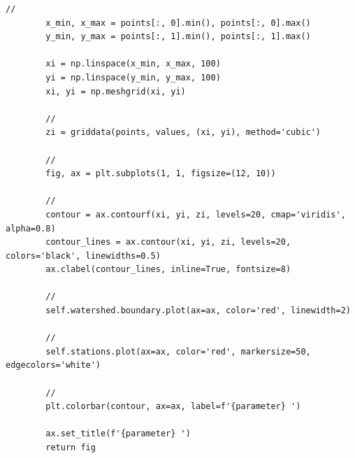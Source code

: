 \begin{lstlisting}[style=python]
        // 
        x_min, x_max = points[:, 0].min(), points[:, 0].max()
        y_min, y_max = points[:, 1].min(), points[:, 1].max()
        
        xi = np.linspace(x_min, x_max, 100)
        yi = np.linspace(y_min, y_max, 100)
        xi, yi = np.meshgrid(xi, yi)
        
        // 
        zi = griddata(points, values, (xi, yi), method='cubic')
        
        // 
        fig, ax = plt.subplots(1, 1, figsize=(12, 10))
        
        // 
        contour = ax.contourf(xi, yi, zi, levels=20, cmap='viridis', alpha=0.8)
        contour_lines = ax.contour(xi, yi, zi, levels=20, colors='black', linewidths=0.5)
        ax.clabel(contour_lines, inline=True, fontsize=8)
        
        // 
        self.watershed.boundary.plot(ax=ax, color='red', linewidth=2)
        
        // 
        self.stations.plot(ax=ax, color='red', markersize=50, edgecolors='white')
        
        // 
        plt.colorbar(contour, ax=ax, label=f'{parameter} ')
        
        ax.set_title(f'{parameter} ')
        return fig
\end{lstlisting}

\hypertarget{section-123}{%
\subsubsection{}\label{section-123}}

\hypertarget{section-124}{%
\paragraph{}\label{section-124}}

